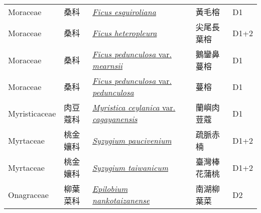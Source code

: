 {\begin{longtable}{L{2.5cm}L{2cm}L{5cm}L{2.5cm}L{3cm}}
    Moraceae & 桑科 & \href{http://www.theplantlist.org/tpl1.1/search?q=Ficus+esquiroliana}{\textit{Ficus esquiroliana} } & 黃毛榕 & D1    \\
    Moraceae & 桑科 & \href{http://www.theplantlist.org/tpl1.1/search?q=Ficus+heteropleura}{\textit{Ficus heteropleura} } & 尖尾長葉榕 & D1+2    \\
    Moraceae & 桑科 & \href{http://www.theplantlist.org/tpl1.1/search?q=Ficus+pedunculosa+var.+mearnsii}{\textit{Ficus pedunculosa} var. \textit{mearnsii} } & 鵝鑾鼻蔓榕 & D1    \\
    Moraceae & 桑科 & \href{http://www.theplantlist.org/tpl1.1/search?q=Ficus+pedunculosa+var.+pedunculosa}{\textit{Ficus pedunculosa} var. \textit{pedunculosa} } & 蔓榕 & D1    \\
    Myristicaceae & 肉豆蔻科 & \href{http://www.theplantlist.org/tpl1.1/search?q=Myristica+ceylanica+var.+cagayanensis}{\textit{Myristica ceylanica} var. \textit{cagayanensis} } & 蘭嶼肉荳蔻 & D1    \\
    Myrtaceae & 桃金孃科 & \href{http://www.theplantlist.org/tpl1.1/search?q=Syzygium+paucivenium}{\textit{Syzygium paucivenium} } & 疏脈赤楠 & D1+2    \\
    Myrtaceae & 桃金孃科 & \href{http://www.theplantlist.org/tpl1.1/search?q=Syzygium+taiwanicum}{\textit{Syzygium taiwanicum} } & 臺灣棒花蒲桃 & D1+2    \\
    Onagraceae & 柳葉菜科 & \href{http://www.theplantlist.org/tpl1.1/search?q=Epilobium+nankotaizanense}{\textit{Epilobium nankotaizanense} } & 南湖柳葉菜 & D2    \\

\end{longtable}}
